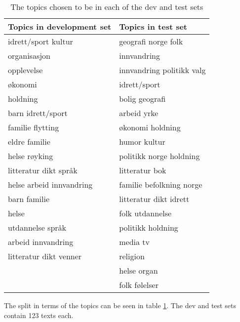 \begin{table}
  \centering
  \begin{tabular}{ll}
    \toprule
    Topics in development set &       Topics in test set \\
    \midrule
         idrett/sport kultur &       geografi norge folk \\
                organisasjon &               innvandring \\
                  opplevelse & innvandring politikk valg \\
                     økonomi &              idrett/sport \\
                    holdning &            bolig geografi \\
           barn idrett/sport &               arbeid yrke \\
            familie flytting &          økonomi holdning \\
               eldre familie &              humor kultur \\
               helse røyking &   politikk norge holdning \\
       litteratur dikt språk &            litteratur bok \\
    helse arbeid innvandring &  familie befolkning norge \\
                barn familie &    litteratur dikt idrett \\
                       helse &           folk utdannelse \\
            utdannelse språk &         politikk holdning \\
          arbeid innvandring &                  media tv \\
      litteratur dikt venner &                  religion \\
                             &               helse organ \\
                             &             folk følelser \\
    \bottomrule
  \end{tabular}
  \caption{The topics chosen to be in each of the dev and test sets}
  \label{topics-in-split}
\end{table}

The split in terms of the topics can be seen in table \ref{topics-in-split}.
The dev and test sets contain 123 texts each.
